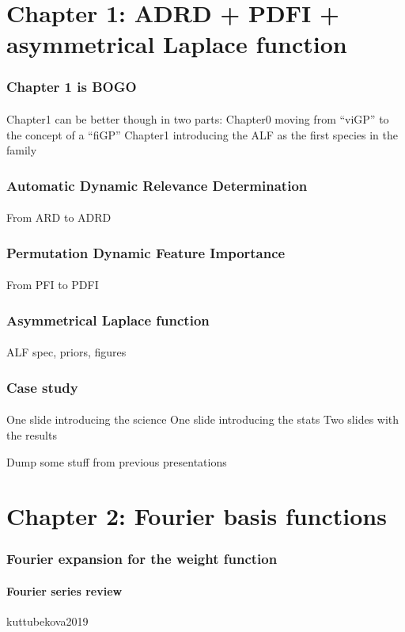 \documentclass{snedecorbeamer}
\begin{document}
\section{Chapter 1: ADRD + PDFI + asymmetrical Laplace function}

\begin{frame}
  \frametitle{Chapter 1 is BOGO}
  \framesubtitle{}

  Chapter1 can be better though in two parts:
  Chapter0 moving from ``viGP'' to the concept of a ``fiGP''
  Chapter1 introducing the ALF as the first species in the family
\end{frame}

\begin{frame}
  \frametitle{Automatic Dynamic Relevance Determination}
  \framesubtitle{}

  From ARD to ADRD
\end{frame}

\begin{frame}
  \frametitle{Permutation Dynamic Feature Importance}
  \framesubtitle{}

  From PFI to PDFI
\end{frame}

\begin{frame}
  \frametitle{Asymmetrical Laplace function}
  \framesubtitle{}

  ALF spec, priors, figures
\end{frame}

\begin{frame}
  \frametitle{Case study}
  \framesubtitle{}

  One slide introducing the science
  One slide introducing the stats
  Two slides with the results
\end{frame}

\begin{frame}
  Dump some stuff from previous presentations

\end{frame}

\section{Chapter 2: Fourier basis functions}

\begin{frame}
  \frametitle{Fourier expansion for the weight function}
  \framesubtitle{Fourier series review}

  kuttubekova2019
\end{frame}
\end{document}
